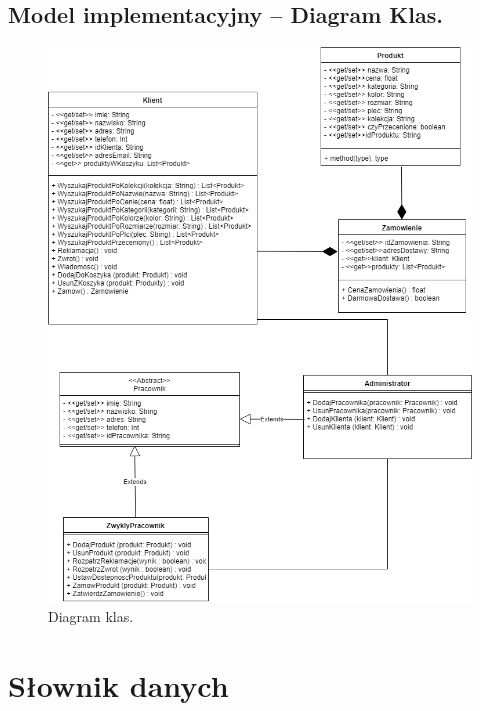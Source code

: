 \documentclass[a4paper,11pt]{article}
\begin{document}
\subsection {Model implementacyjny – Diagram Klas.}
\begin{figure}[H]
	\centering
		\includegraphics[width=1\textwidth]{Diagramy/DFD0-Diagram-UML.png}
	\caption{Diagram klas.}
\end{figure}

\section {Słownik danych}

\end{document}
